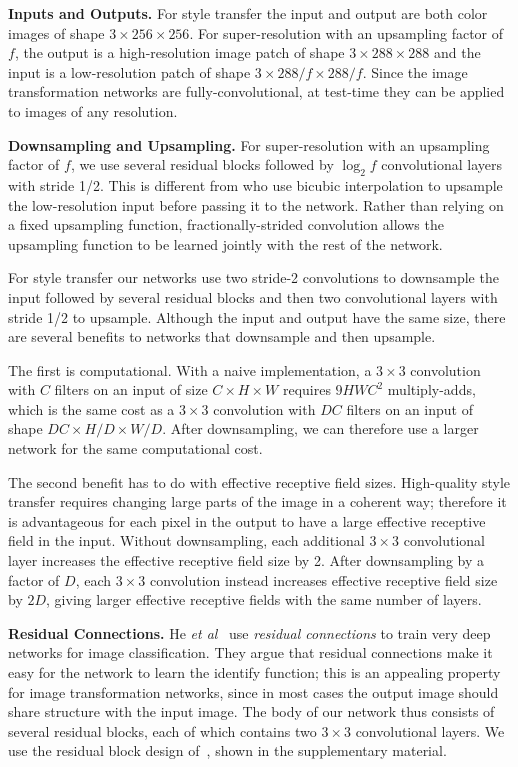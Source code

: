 \documentclass[runningheads]{llncs}
\newcommand{\etal}{\textit{et al}}
\begin{document}
\vspace{1mm}
\noindent \textbf{Inputs and Outputs.}
For style transfer the input and output are both color images of shape $3\times256\times256$.
For super-resolution with an upsampling factor of $f$, the output is a high-resolution image
patch of shape $3\times288\times288$ and the input is a low-resolution patch of shape
$3\times288/f\times288/f$. Since the image transformation networks are fully-convolutional,
at test-time they can be applied to images of any resolution.

\vspace{1mm}
\noindent \textbf{Downsampling and Upsampling.}
For super-resolution with an upsampling factor of $f$, we use several residual
blocks followed by $\log_2f$ convolutional layers with stride 1/2. This is different from
\cite{dong2015image} who use bicubic interpolation to upsample the low-resolution input
before passing it to the network. Rather than relying on a fixed upsampling function,
fractionally-strided convolution allows the upsampling function to be learned jointly with
the rest of the network.

For style transfer our networks use two stride-2 convolutions to downsample the input
followed by several residual blocks and then two convolutional layers with stride 1/2
to upsample. Although the input and output have the same size, there are several benefits to
networks that downsample and then upsample.

The first is computational. With a naive implementation, a $3\times3$ convolution with $C$ filters on
an input of size $C\times H\times W$ requires $9HWC^2$ multiply-adds, which is the same cost
as a $3\times3$ convolution with $DC$ filters on an input of shape $DC\times H/D\times W/D$.
After downsampling, we can therefore use a larger network for the same computational cost.

The second benefit has to do with effective receptive field sizes. High-quality style
transfer requires changing large parts of the image in a coherent way; therefore it is
advantageous for each pixel in the output to have a large effective receptive field in
the input. Without downsampling, each additional $3\times3$ convolutional layer
increases the effective receptive field size by 2. After downsampling by a factor of
$D$, each $3\times3$ convolution instead increases effective receptive field size by $2D$,
giving larger effective receptive fields with the same number of layers.

\vspace{1mm}
\noindent \textbf{Residual Connections.}
He \etal~\cite{he2015deep} use \emph{residual connections} to train very deep
networks for image classification. They argue that residual connections make it easy for the
network to learn the identify function; this is an appealing property for image transformation
networks, since in most cases the output image should share structure with the input image.
The body of our network thus consists of several residual blocks, each of which contains
two $3\times3$ convolutional layers. We use the residual block design
of~\cite{gross2016training}, shown in the supplementary material.
\end{document}
